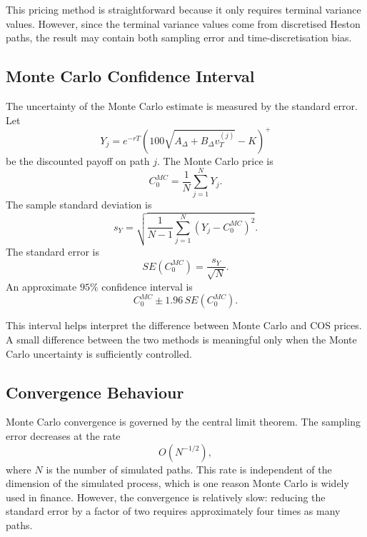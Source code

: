 This pricing method is straightforward because it only requires terminal variance values. However, since the terminal variance values come from discretised Heston paths, the result may contain both sampling error and time-discretisation bias.

\subsection{Monte Carlo Confidence Interval}

The uncertainty of the Monte Carlo estimate is measured by the standard error. Let
\[
Y_j
=
e^{-rT}
\left(
100\sqrt{A_\Delta+B_\Delta v_T^{(j)}}
-
K
\right)^+
\]
be the discounted payoff on path \(j\). The Monte Carlo price is
\begin{equation}
C_0^{MC}
=
\frac{1}{N}
\sum_{j=1}^{N}Y_j.
\end{equation}
The sample standard deviation is
\begin{equation}
s_Y
=
\sqrt{
\frac{1}{N-1}
\sum_{j=1}^{N}
\left(
Y_j-C_0^{MC}
\right)^2
}.
\end{equation}
The standard error is
\begin{equation}
SE(C_0^{MC})
=
\frac{s_Y}{\sqrt{N}}.
\end{equation}
An approximate \(95\%\) confidence interval is
\begin{equation}
C_0^{MC}
\pm
1.96\,SE(C_0^{MC}).
\end{equation}

This interval helps interpret the difference between Monte Carlo and COS prices. A small difference between the two methods is meaningful only when the Monte Carlo uncertainty is sufficiently controlled.

\subsection{Convergence Behaviour}

Monte Carlo convergence is governed by the central limit theorem. The sampling error decreases at the rate
\begin{equation}
O(N^{-1/2}),
\end{equation}
where \(N\) is the number of simulated paths. This rate is independent of the dimension of the simulated process, which is one reason Monte Carlo is widely used in finance. However, the convergence is relatively slow: reducing the standard error by a factor of two requires approximately four times as many paths.

